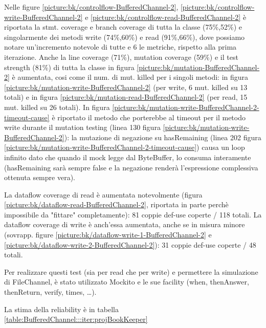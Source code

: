 \documentclass[10pt, a4paper]{article}
\newcommand{\gettablelabel}[5]{table:#1:#2:#3:iter#4:proj#5}
\newcommand{\getreltablelabel}[2]{\gettablelabel{#1}{}{}{}{#2}}
\newcommand{\getpicturelabel}[1]{picture:#1}
\def\bookkeeper{BookKeeper}
\begin{document}
	Nelle figure 
	\ref{\getpicturelabel{bk/controlflow-BufferedChannel-2}}, 
	\ref{\getpicturelabel{bk/controlflow-write-BufferedChannel-2}} e 
	\ref{\getpicturelabel{bk/controlflow-read-BufferedChannel-2}} è riportata la stmt.
	coverage e branch coverage di tutta la classe (75\%,52\%) e singolarmente dei metodi write (74\%,60\%) e read (91\%,66\%), dove possiamo notare
	un'incremento notevole di tutte e 6 le metriche, rispetto alla prima iterazione.
	Anche la line coverage (71\%), mutation coverage (59\%) e il test strength (81\%) di tutta la classe in figura
	\ref{\getpicturelabel{bk/mutation-BufferedChannel-2}} 
	è aumentata, cosi come il num. di mut. killed per i singoli metodi: in figura
	\ref{\getpicturelabel{bk/mutation-write-BufferedChannel-2}} (per write, 6 mut. killed su 13 totali) e in
	figura \ref{\getpicturelabel{bk/mutation-read-BufferedChannel-2}} (per read, 15 mut. killed su 26 totali).
	In figura \ref{\getpicturelabel{bk/mutation-write-BufferedChannel-2-timeout-cause}} è riportato il metodo
	che porterebbe al timeout per il metodo write durante il mutation testing (linea 130 figura
	\ref{\getpicturelabel{bk/mutation-write-BufferedChannel-2}}): la mutazione di negazione
	su hasRemaining (linea 202 figura \ref{\getpicturelabel{bk/mutation-write-BufferedChannel-2-timeout-cause}})
	causa un loop infinito dato che quando il mock legge dal ByteBuffer, lo consuma interamente (hasRemaining
	sarà sempre false e la negazione renderà l'espressione complessiva ottenuta sempre vera).
	
	La dataflow coverage di read è aumentata notevolmente (figura
	\ref{\getpicturelabel{bk/dataflow-read-BufferedChannel-2}}, 
	riportata in parte perchè impossibile da "fittare" completamente): 81 coppie def-use coperte / 118 totali.
	La dataflow coverage di write è anch'essa aumentata, anche se in misura minore (sovrapp. figure
	\ref{\getpicturelabel{bk/dataflow-write-1-BufferedChannel-2}} e
	\ref{\getpicturelabel{bk/dataflow-write-2-BufferedChannel-2}}): 31 coppie def-use coperte / 48 totali.
	
	Per realizzare questi test (sia per read che per write)
	e permettere la simulazione di FileChannel, è stato utilizzato Mockito e le
	sue facility (when, thenAnswer, thenReturn, verify, times, \dots).
	
	La stima della reliability è in tabella \ref{\getreltablelabel{BufferedChannel}{\bookkeeper}}
	
\end{document}
